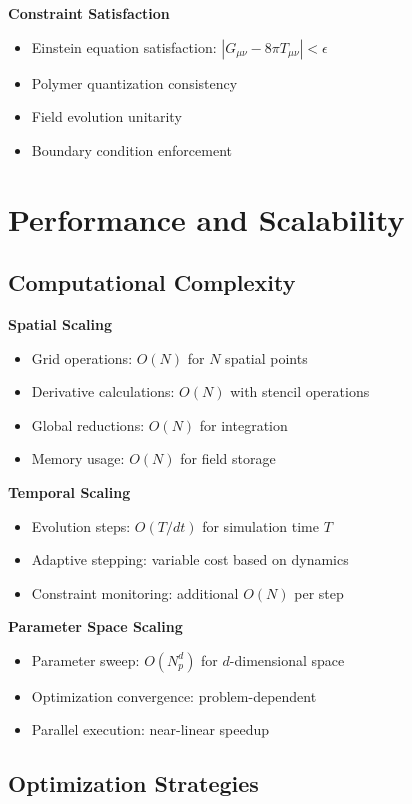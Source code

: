 \documentclass[11pt]{article}
\begin{document}
\textbf{Constraint Satisfaction}
\begin{itemize}
\item Einstein equation satisfaction: $|G_{\mu\nu} - 8\pi T_{\mu\nu}| < \epsilon$
\item Polymer quantization consistency
\item Field evolution unitarity
\item Boundary condition enforcement
\end{itemize}

\section{Performance and Scalability}

\subsection{Computational Complexity}

\textbf{Spatial Scaling}
\begin{itemize}
\item Grid operations: $O(N)$ for $N$ spatial points
\item Derivative calculations: $O(N)$ with stencil operations
\item Global reductions: $O(N)$ for integration
\item Memory usage: $O(N)$ for field storage
\end{itemize}

\textbf{Temporal Scaling}
\begin{itemize}
\item Evolution steps: $O(T/dt)$ for simulation time $T$
\item Adaptive stepping: variable cost based on dynamics
\item Constraint monitoring: additional $O(N)$ per step
\end{itemize}

\textbf{Parameter Space Scaling}
\begin{itemize}
\item Parameter sweep: $O(N_p^d)$ for $d$-dimensional space
\item Optimization convergence: problem-dependent
\item Parallel execution: near-linear speedup
\end{itemize}

\subsection{Optimization Strategies}
\end{document}
